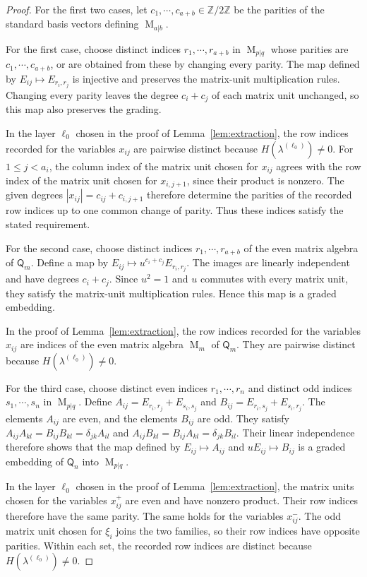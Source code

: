 \documentclass[11pt,reqno]{amsart}
\newcommand{\Mat}{\operatorname{M}}
\newcommand{\Ztwo}{\mathbb Z/2\mathbb Z}
\newcommand{\Qtype}{\mathsf Q}
\theoremstyle{definition}
\theoremstyle{remark}
\numberwithin{equation}{section}
\begin{document}
\begin{proof}
For the first two cases, let
$c_1,\cdots,c_{a+b}\in\Ztwo$ be the parities
of the standard basis vectors defining $\Mat_{a|b}$.

For the first case, choose distinct indices
$r_1,\cdots,r_{a+b}$ in $\Mat_{p|q}$ whose parities
are $c_1,\cdots,c_{a+b}$, or are obtained from
these by changing every parity.
The map
defined by $
E_{ij}\longmapsto E_{r_i,r_j}$
is injective and preserves the matrix-unit
multiplication rules.
Changing every parity leaves the degree
$c_i+c_j$ of each matrix unit unchanged,
so this map also preserves the grading.

In the layer $\ell_0$ chosen in the proof of
Lemma~\ref{lem:extraction}, the row indices recorded
for the variables $x_{ij}$ are pairwise distinct
because $H(\lambda^{(\ell_0)})\ne0$.
For $1\leq j<a_i$, the column index of the matrix
unit chosen for $x_{ij}$ agrees with the row index
of the matrix unit chosen for $x_{i,j+1}$,
since their product is nonzero.
The given degrees
$|x_{ij}|=c_{ij}+c_{i,j+1}$ therefore determine
the parities of the recorded row indices up to
one common change of parity.
Thus these indices satisfy the stated requirement.

For the second case, choose distinct indices
$r_1,\cdots,r_{a+b}$ of the even matrix algebra
of $\Qtype_m$. Define
 a map by $
E_{ij}\longmapsto u^{c_i+c_j}E_{r_i,r_j}$.
The images are linearly independent and have
degrees $c_i+c_j$.
Since $u^2=1$ and $u$ commutes with every
matrix unit, they satisfy the matrix-unit
multiplication rules. Hence this map is
a graded embedding.

In the proof of Lemma~\ref{lem:extraction},
the row indices recorded for the variables $x_{ij}$
are indices of the even matrix algebra $\Mat_m$
of $\Qtype_m$.
They are pairwise distinct because
$H(\lambda^{(\ell_0)})\ne0$.

For the third case, choose distinct even
indices $r_1,\cdots,r_n$ and distinct odd indices
$s_1,\cdots,s_n$ in $\Mat_{p|q}$.
Define
$
A_{ij}=E_{r_i,r_j}+E_{s_i,s_j}$ and $
B_{ij}=E_{r_i,s_j}+E_{s_i,r_j}$.
The elements $A_{ij}$ are even, and the elements
$B_{ij}$ are odd. They satisfy $
A_{ij}A_{kl}=B_{ij}B_{kl}=\delta_{jk}A_{il}$ and $
A_{ij}B_{kl}=B_{ij}A_{kl}=\delta_{jk}B_{il}$.
Their linear independence therefore shows that the map defined by $
E_{ij}\longmapsto A_{ij}$ and $
uE_{ij}\longmapsto B_{ij}$
is a graded embedding of $\Qtype_n$
into $\Mat_{p|q}$.

In the layer $\ell_0$ chosen in the proof of
Lemma~\ref{lem:extraction}, the matrix units chosen
for the variables $x^+_{ij}$ are even and have
nonzero product. Their row indices therefore
have the same parity.
The same holds for the variables $x^-_{ij}$.
The odd matrix unit chosen for $\xi_i$ joins
the two families, so their row indices have
opposite parities.
Within each set, the recorded row indices are
distinct because $H(\lambda^{(\ell_0)})\ne0$.


\end{proof}
\end{document}
